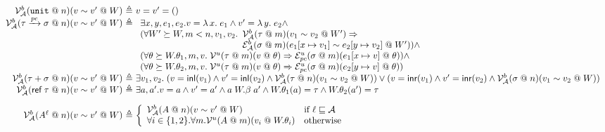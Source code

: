\documentclass{notes}
\newcommand{\unit}{()}
\newcommand{\Unit}{\texttt{unit}}
\newcommand{\fun}[2]{\lambda\,#1.\;#2}
\newcommand{\inl}[1]{\textsf{inl}(#1)}
\newcommand{\inr}[1]{\textsf{inr}(#1)}
\newcommand{\ptr}[1]{\textsf{ref}\;#1}
\newcommand{\pc}{\textit{pc}}
\begin{document}
$$
\begin{array}{r@{~\triangleq~}l}
  \mathcal{V}^b_{\mathcal{A}}(\Unit \mathrel{@} n)(v \sim v' \mathrel{@} W) & v = v' = \unit\\
  \mathcal{V}^b_{\mathcal{A}}(\tau \xrightarrow{\pc} \sigma \mathrel{@} n)(v \sim v' \mathrel{@} W) &
                                                         \begin{array}[t]{l}
                                                           \exists x, y, e_1, e_2. v = \fun{x}{e_1} \land v' = \fun{y}{e_2} \land\\
                                                           (\forall W' \succeq W, m < n, v_1, v_2. \begin{array}[t]{l}\mathcal{V}_{\mathcal{A}}^b(\tau \mathrel{@} m)(v_1 \sim v_2 \mathrel{@} W') \Rightarrow\\ \mathcal{E}_{\mathcal{A}}^b(\sigma \mathrel{@} m)(e_1[x \mapsto v_1] \sim e_2[y \mapsto v_2] \mathrel{@} W')) \land\end{array} \\
                                                           (\forall \theta \succeq W.\theta_1, m, v.\; \mathcal{V}^u(\tau \mathrel{@} m)(v \mathrel{@} \theta) \Rightarrow \mathcal{E}_\pc^u(\sigma \mathrel{@} m)(e_1[x \mapsto v] \mathrel{@} \theta)) \land\\
                                                           (\forall \theta \succeq W.\theta_2, m, v.\; \mathcal{V}^u(\tau \mathrel{@} m)(v \mathrel{@} \theta) \Rightarrow \mathcal{E}_\pc^u(\sigma \mathrel{@} m)(e_2[y \mapsto v] \mathrel{@} \theta))\\
                                                         \end{array}\\
  \mathcal{V}^b_{\mathcal{A}}(\tau + \sigma \mathrel{@} n)(v \sim v' \mathrel{@} W) &
                                         \exists v_1, v_2.\; (v = \inl{v_1} \land v' = \inl{v_2} \land \mathcal{V}_{\mathcal{A}}^b(\tau \mathrel{@} n) (v_1 \sim v_2 \mathrel{@} W)) \lor (v = \inr{v_1} \land v' = \inr{v_2} \land \mathcal{V}_{\mathcal{A}}^b(\sigma \mathrel{@} n)(v_1 \sim v_2 \mathrel{@} W))\\
  \mathcal{V}^b_{\mathcal{A}}(\ptr{\tau} \mathrel{@} n)(v \sim v' \mathrel{@} W) &
                                           \exists a, a'. v = a \land v' = a' \land a \mathrel{W.\beta} a' \land W.\theta_1(a) = \tau \land W.\theta_2(a') = \tau\\[1em]
  \mathcal{V}_{\mathcal{A}}^b(A^\ell \mathrel{@} n)(v \sim v' \mathrel{@} W) & \left\{\begin{array}{ll} \mathcal{V}^b_{\mathcal{A}}(A \mathrel{@} n)(v \sim v' \mathrel{@} W) & \text{if}~\ell \sqsubseteq \mathcal{A}\\ \forall i \in \{1, 2\}. \forall m. \mathcal{V}^u(A \mathrel{@} m)(v_i \mathrel{@} W.\theta_i) & \text{otherwise} \end{array}\right.\\[3em]

\end{array}$$
\end{document}
